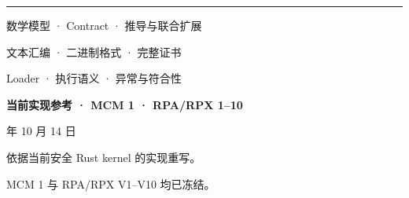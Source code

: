 \documentclass[UTF8,10pt,a4paper,oneside,fontset=fandol]{ctexbook}
\begin{document}
\frontmatter
\hypersetup{pageanchor=false}
\begin{titlepage}
\color{rpxblue}
\vspace*{12mm}
\par
\vspace{7mm}
\par
\vspace{4mm}
\par
\vspace{9mm}
\noindent\rule{\textwidth}{1pt}\par
\vspace{7mm}
\par
{}\par
\vspace{10mm}
\noindent 数学模型 · Contract · 推导与联合扩展\par
\noindent 文本汇编 · 二进制格式 · 完整证书\par
\noindent Loader · 执行语义 · 异常与符合性\par
\vfill
\noindent\textbf{当前实现参考 · MCM 1 · RPA/RPX 1--10}\par
{} 年 10 月 14 日\par
\vspace{5mm}
\noindent 依据当前安全 Rust kernel 的实现重写。\par
\noindent MCM 1 与 RPA/RPX V1--V10 均已冻结。\par
\end{titlepage}
\hypersetup{pageanchor=true}

\tableofcontents
\mainmatter








\appendix

\end{document}
